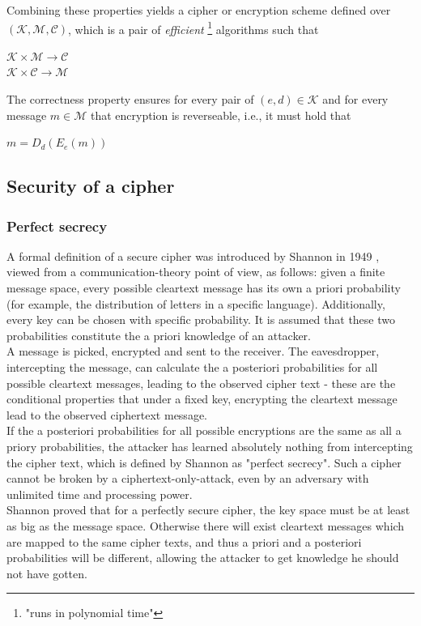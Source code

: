 Combining these properties yields a cipher or encryption scheme defined over $\mathcal{(K,M,C)}$, which is a pair of \textit{efficient}
 \footnote{"runs in polynomial time"} algorithms such that
 \begin{center}
   $\mathcal{K} \times \mathcal{M} \rightarrow \mathcal{C}$
   \\
   $\mathcal{K} \times \mathcal{C} \rightarrow \mathcal{M}$
 \end{center}
 The correctness property ensures for every pair of $(e,d) \in \mathcal{K}$ and for every message $m \in \mathcal{M}$ that encryption is reverseable, i.e., 
 it must hold that 
 \begin{center}  
 $ m = D_d(E_e(m))$
  \end{center}

\subsection{Security of a cipher}

\subsubsection{Perfect secrecy}

A formal definition of a secure cipher was introduced by Shannon in 1949 \cite{6769090}, viewed from a communication-theory point of view, as follows:
given a finite message space, every possible cleartext message has its own a priori probability (for example, the distribution of letters in a 
specific language). Additionally, every key can be chosen with specific probability. It is assumed that these
two probabilities constitute the a priori knowledge of an attacker.
\\
A message is picked, encrypted
and sent to the receiver. The eavesdropper, intercepting the message, can calculate the a posteriori probabilities for all possible cleartext messages, 
leading to the observed cipher text - these are the conditional properties that under a fixed key, encrypting the cleartext message lead to the
observed ciphertext message.
\\
If the a posteriori probabilities for all possible encryptions are the same as all a priory probabilities, the attacker has learned absolutely
nothing from intercepting the cipher text, which is defined by Shannon as "perfect secrecy". Such a cipher cannot be broken by a ciphertext-only-attack,
even by an adversary with unlimited time and processing power.
\\
Shannon proved that for a perfectly secure cipher, the key space must be at least as big as the message space.
Otherwise there will exist cleartext messages which are mapped to the same cipher texts, and thus a priori and a posteriori probabilities will be different,
allowing the attacker to get knowledge he should not have gotten. 

